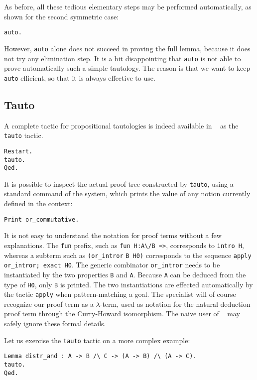 \documentclass{book}
\begin{document}
As before, all these tedious elementary steps may be performed automatically,
as shown for the second symmetric case:

\begin{lstlisting}
auto.
\end{lstlisting}

However, \verb:auto: alone does not succeed in proving the full lemma, because
it does not try any elimination step.
It is a bit disappointing that \verb:auto: is not able to prove automatically 
such a simple tautology. The reason is that we want to keep
\verb:auto: efficient, so that it is always effective to use. 

\subsection{Tauto}

A complete tactic for propositional
tautologies is indeed available in \Coq~ as the \verb:tauto: tactic. 
\begin{lstlisting}
Restart.
tauto.
Qed.
\end{lstlisting}

It is possible to inspect the actual proof tree constructed by \verb:tauto:,
using a standard command of the system, which prints the value of any notion 
currently defined in the context:
\begin{lstlisting}
Print or_commutative.
\end{lstlisting}

It is not easy to understand the notation for proof terms without a few
explanations. The \texttt{fun} prefix, such as \verb+fun H:A\/B =>+, 
corresponds
to \verb:intro H:, whereas a subterm such as 
\verb:(or_intror: \verb:B H0):
corresponds to the sequence \verb:apply or_intror; exact H0:. 
The generic combinator \verb:or_intror: needs to be instantiated by
the two properties \verb:B: and \verb:A:. Because \verb:A: can be
deduced from the type of \verb:H0:, only  \verb:B: is printed.
The two instantiations are effected automatically by the tactic
\verb:apply: when pattern-matching a goal. The specialist will of course
recognize our proof term as a $\lambda$-term, used as notation for the
natural deduction proof term through the Curry-Howard isomorphism. The
naive user of \Coq~ may safely ignore these formal details.

Let us exercise the \verb:tauto: tactic on a more complex example:
\begin{lstlisting}
Lemma distr_and : A -> B /\ C -> (A -> B) /\ (A -> C).
tauto.
Qed.
\end{lstlisting}
\end{document}
